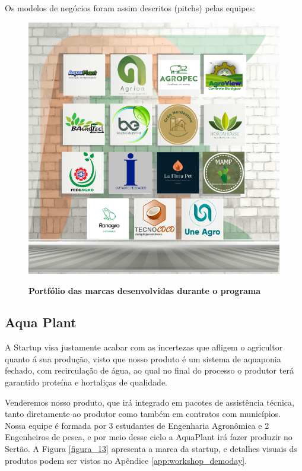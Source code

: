 Os modelos de negócios foram assim descritos (pitchs) pelas equipes:
\begin{figure}[H]
\centering
\caption{\textbf{Portfólio das marcas desenvolvidas durante o programa}}
\includegraphics[scale=2]{Imagens/portfolio.png}
\label{fig_marcas}
\end{figure}


\subsection{Aqua Plant}

A Startup visa justamente acabar com as incertezas que afligem o agricultor quanto á sua produção, visto que nosso produto é um sistema de aquaponia fechado, com recirculação de água, ao qual no final do processo o produtor terá garantido proteína e hortaliças de qualidade.

Venderemos nosso produto, que irá integrado em pacotes de assistência técnica, tanto diretamente ao produtor como também em contratos com municípios. Nossa equipe é formada por 3 estudantes de Engenharia Agronômica e 2 Engenheiros de pesca, e por meio desse ciclo a AquaPlant irá fazer produzir no Sertão. A Figura \ref{figura_13} apresenta a marca da startup, e detalhes visuais  ds produtos podem ser vistos no Apêndice \ref{app:workshop_demoday}.


